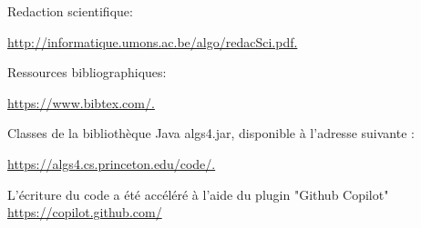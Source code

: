 Redaction scientifique:

\href{http://informatique.umons.ac.be/algo/redacSci.pdf.}{http://informatique.umons.ac.be/algo/redacSci.pdf.
}

Ressources bibliographiques:

\href{https://www.bibtex.com/.}{https://www.bibtex.com/.}


Classes de la bibliothèque Java
algs4.jar, disponible à l’adresse suivante :

\href{https://algs4.cs.princeton.edu/code/.}{https://algs4.cs.princeton.edu/code/.}

L'écriture du code a été accéléré à l'aide du plugin "Github Copilot"
\href{https://copilot.github.com/}{https://copilot.github.com/}




